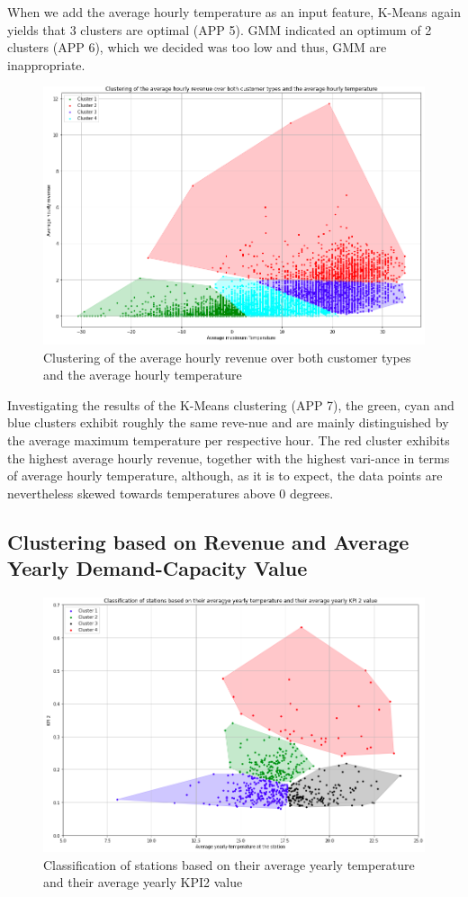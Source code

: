 When we add the average hourly temperature as an input feature, K-Means again yields that 3 clusters are optimal (APP 5). GMM indicated an optimum of 2 clusters (APP 6), which we decided was too low and thus, GMM are inappropriate. 

\begin{figure}[H]
   \centering
    \includegraphics[width=0.8\linewidth]{./Figures/BC_APP7.png}
    \caption{Clustering of the average hourly revenue over both customer types and the average hourly temperature}
    \label{BCAPP7}
\end{figure}

Investigating the results of the K-Means clustering (APP 7), the green, cyan and blue clusters exhibit roughly the same reve-nue and are mainly distinguished by the average maximum temperature per respective hour. The red cluster exhibits the highest average hourly revenue, together with the highest vari-ance in terms of average hourly temperature, although, as it is to expect, the data points are nevertheless skewed towards temperatures above 0 degrees.

\subsection*{Clustering based on Revenue and Average Yearly Demand-Capacity Value}
\label{app:A5}

\begin{figure}[H]
   \centering
    \includegraphics[width=0.8\linewidth]{./Figures/BC_APP8.png}
    \caption{Classification of stations based on their average yearly temperature and their average yearly KPI2 value}
    \label{BCAPP8}
\end{figure}

